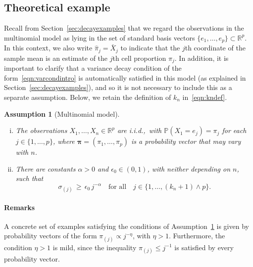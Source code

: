 \documentclass[aos,preprint]{imsart}
\numberwithin{equation}{section}
\theoremstyle{plain}
\newtheorem{assumption}{Assumption}[section]
\newcommand{\R}{\mathbb{R}}
\renewcommand{\hat}[1]{\widehat{#1}}
\renewcommand{\P}{\mathbb{P}}
\newcommand{\e}{\epsilon}
\newcommand{\1}{{\bf{1}}}
\newcommand{\0}{\mathbf{0}}
\begin{document}
\subsection{Theoretical example}\label{sec:M1}
Recall from Section~\ref{sec:decayexamples} that we regard the observations in the multinomial model as lying in the set of standard basis vectors $\{e_1,\dots,e_p\}\subset\R^p$. In this context, we also write $\hat\pi_j=\bar{X}_j$ to indicate that the $j$th coordinate of the sample mean is an estimate of the $j$th cell proportion $\pi_j$. In addition, it is important to clarify that a variance decay condition of the form~\eqref{eqn:varcondintro} is automatically satisfied in this model (as explained in Section~\ref{sec:decayexamples}), and so it is not necessary to include this as a separate assumption. Below, we retain the definition of $k_n$ in~\eqref{eqn:kndef}.
%
\begin{assumption}[Multinomial model]\label{A:mult}
~\\[-0.3cm]
\begin{enumerate}[(i)]
\item The observations $X_1,\dots,X_n\in\R^p$ are i.i.d.,~with $\P(X_1=e_j)=\pi_j$ for each $j\in\{1,\dots,p\}$, where $\boldsymbol\pi=(\pi_1,\dots,\pi_p)$ is a probability vector that may vary with $n$.\\[-0.2cm]
%
\item There are constants $\alpha>0$ and $\e_0\in(0,1)$, with neither depending on $n$, such that 
%
\begin{equation}
\sigma_{(j)} \,  \geq \, \e_0 \, j^{-\alpha} \ \ \ \text{ for all } \ \ \ j\in \{1,\dots,(k_n+1)\wedge p\}.
\end{equation}
%
%
\end{enumerate}
\end{assumption}
\paragraph{Remarks}
A concrete set of examples satisfying the conditions of Assumption~\ref{A:mult} is given by probability vectors of the form $\pi_{(j)}\propto j^{-\eta}$, with $\eta>1$. Furthermore, the condition $\eta>1$ is mild, since the inequality $\pi_{(j)}\leq j^{-1}$ is satisfied by every probability vector.
\end{document}
